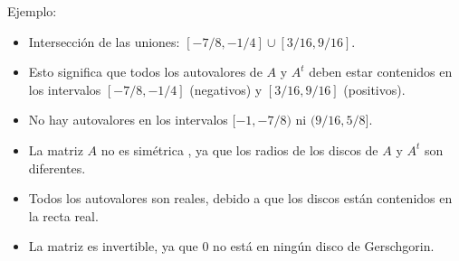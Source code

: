 \documentclass[11pt]{beamer}
\begin{document}
    \begin{frame}{Ejemplo:}
      \begin{itemize}
        \item<1-> Intersecci\'on de las uniones: $[-7/8,-1/4]\cup[3/16,9/16]$.
        \item<2-> Esto significa que todos los autovalores de $A$ y $A^t$ deben estar contenidos en los intervalos $[-7/8,-1/4]$ (negativos) y $[3/16,9/16]$ (positivos).
        \item<3-> No hay autovalores en los intervalos $[-1,-7/8)$ ni $(9/16,5/8]$.
        \item<4-> La matriz $A$ no es simétrica , ya que los radios de los discos de $A$ y $A^t$ son diferentes.
        \item<5-> Todos los autovalores son reales, debido a que los discos están contenidos en la recta real.
        \item<6-> La matriz es invertible, ya que 0 no está en ningún disco de Gerschgorin.
      \end{itemize}
    \end{frame}
\end{document}
